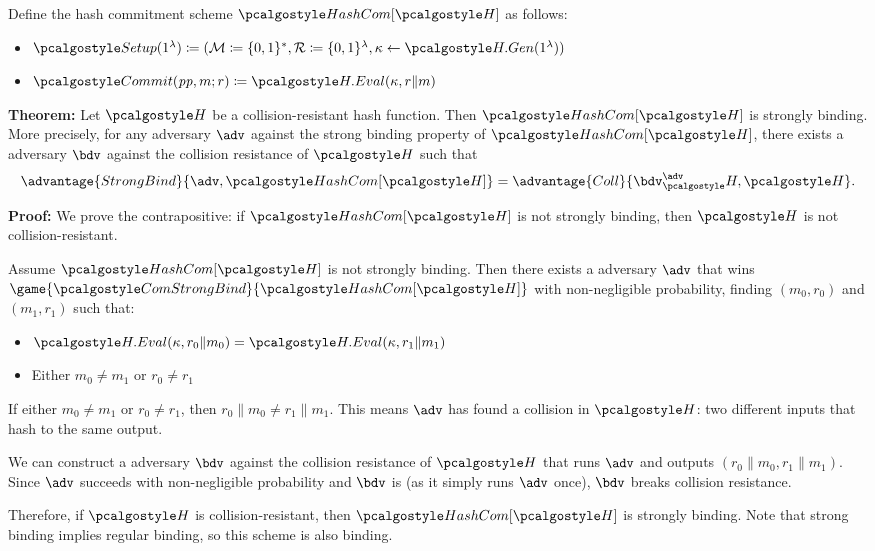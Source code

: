 \ifsolutions
\begin{mysolution}
  Define the hash commitment scheme $\algo{HashCom}[\algo{H}]$ as follows:
  \begin{itemize}
    \item $\algo{Setup}(1^\lambda) \defeq (\mathcal{M} \defeq \{0, 1\}^*, \mathcal{R} \defeq \{0, 1\}^\lambda, \kappa \gets \algo{H.Gen}(1^\lambda))$
    \item $\algo{Commit}(\params, m; r) \defeq \algo{H.Eval}(\kappa, r \| m)$
  \end{itemize}
  
  \textbf{Theorem:} Let $\algo{H}$ be a collision-resistant hash function. Then $\algo{HashCom}[\algo{H}]$ is strongly binding.
  More precisely, for any \ppt adversary $\adv$ against the strong binding property of $\algo{HashCom}[\algo{H}]$, there exists a \ppt adversary $\bdv$ against the collision resistance of $\algo{H}$ such that
  \[
  \advantage{StrongBind}{\adv, \algo{HashCom}[\algo{H}]} = \advantage{Coll}{\bdv^\adv_\algo{H}, \algo{H}}.
  \]
  
  \textbf{Proof:} We prove the contrapositive: if $\algo{HashCom}[\algo{H}]$ is not strongly binding, then $\algo{H}$ is not collision-resistant.
  
  Assume $\algo{HashCom}[\algo{H}]$ is not strongly binding.
  Then there exists a \ppt adversary $\adv$ that wins $\game{\algo{ComStrongBind}}{\algo{HashCom}[\algo{H}]}$ with non-negligible probability, finding $(m_0, r_0)$ and $(m_1, r_1)$ such that:
  \begin{itemize}
    \item $\algo{H.Eval}(\kappa, r_0 \| m_0) = \algo{H.Eval}(\kappa, r_1 \| m_1)$
    \item Either $m_0 \neq m_1$ or $r_0 \neq r_1$
  \end{itemize}
  
  If either $m_0 \neq m_1$ or $r_0 \neq r_1$, then $r_0 \| m_0 \neq r_1 \| m_1$.
  This means $\adv$ has found a collision in $\algo{H}$: two different inputs that hash to the same output.
  
  We can construct a \ppt adversary $\bdv$ against the collision resistance of $\algo{H}$ that runs $\adv$ and outputs $(r_0 \| m_0, r_1 \| m_1)$.
  Since $\adv$ succeeds with non-negligible probability and $\bdv$ is \ppt (as it simply runs $\adv$ once), $\bdv$ breaks collision resistance.
  
  Therefore, if $\algo{H}$ is collision-resistant, then $\algo{HashCom}[\algo{H}]$ is strongly binding.
  Note that strong binding implies regular binding, so this scheme is also binding.
\end{mysolution}
\fi

